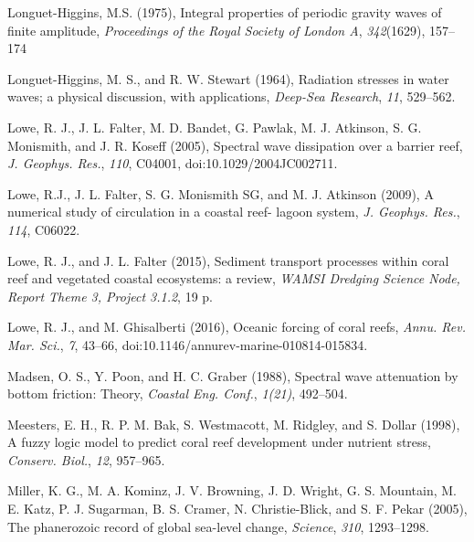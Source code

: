 \documentclass[default,jgrga]{agutex2015}
\begin{document}
\begin{article}
\begin{thebibliography}{}
Longuet-Higgins, M.S. (1975), Integral properties of periodic gravity waves of finite amplitude, \textit{Proceedings of the Royal Society of London A}, \textit{342}(1629), 157--174

Longuet-Higgins, M. S., and R. W. Stewart (1964), Radiation stresses in water waves; a physical discussion, with applications, \textit{Deep-Sea Research}, \textit{11}, 529--562.

Lowe, R. J., J. L. Falter, M. D. Bandet, G. Pawlak, M. J. Atkinson, S. G. Monismith, and J. R. Koseff (2005), Spectral wave dissipation over a barrier reef, \textit{J. Geophys. Res.}, \textit{110}, C04001, doi:10.1029/2004JC002711.

Lowe, R.J., J. L. Falter, S. G. Monismith SG, and M. J. Atkinson (2009), A numerical study of circulation in a coastal reef-
lagoon system, \textit{J. Geophys. Res.}, \textit{114}, C06022.

Lowe, R. J., and J. L. Falter (2015), Sediment transport processes within coral reef and vegetated coastal ecosystems: a review, \textit{WAMSI Dredging Science Node, Report Theme 3, Project 3.1.2}, 19 p.

Lowe, R. J., and M. Ghisalberti (2016), Oceanic forcing of coral reefs, \textit{Annu. Rev. Mar. Sci.}, \textit{7}, 43--66, doi:10.1146/annurev-marine-010814-015834.

Madsen, O. S., Y. Poon, and H. C. Graber (1988), Spectral wave attenuation by bottom friction: Theory, \textit{Coastal Eng. Conf.}, \textit{1(21)}, 492--504.

Meesters, E. H., R. P. M. Bak, S. Westmacott, M. Ridgley, and S. Dollar (1998), A fuzzy logic model to predict coral reef development under nutrient stress, \textit{Conserv. Biol.}, \textit{12}, 957--965.

Miller, K. G., M. A. Kominz, J. V. Browning, J. D. Wright, G. S. Mountain, M. E. Katz, P. J. Sugarman, B. S. Cramer, N. Christie-Blick, and S. F. Pekar (2005), The phanerozoic record of global sea-level change, \textit{Science}, \textit{310}, 1293--1298.


\end{thebibliography}
\end{article}
\end{document}
